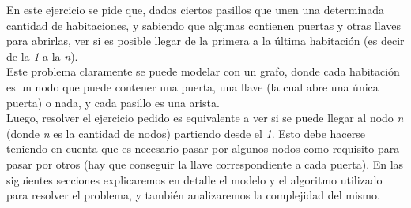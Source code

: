En este ejercicio se pide que, dados ciertos pasillos que unen una determinada cantidad de habitaciones, y sabiendo que algunas contienen puertas y otras llaves para abrirlas, ver si es posible llegar de la primera a la última habitación (es decir de la \textit{1} a la \textit{n}). \\
Este problema claramente se puede modelar con un grafo, donde cada habitación es un nodo que puede contener una puerta, una llave (la cual abre una única puerta) o nada, y cada pasillo es una arista. \\
Luego, resolver el ejercicio pedido es equivalente a ver si se puede llegar al nodo \textit{n} (donde \textit{n} es la cantidad de nodos) partiendo desde el \textit{1}. Esto debe hacerse teniendo en cuenta que es necesario pasar por algunos nodos como requisito para pasar por otros (hay que conseguir la llave correspondiente a cada puerta).
En las siguientes secciones explicaremos en detalle el modelo y el algoritmo utilizado para resolver el problema, y también analizaremos la complejidad del mismo.
